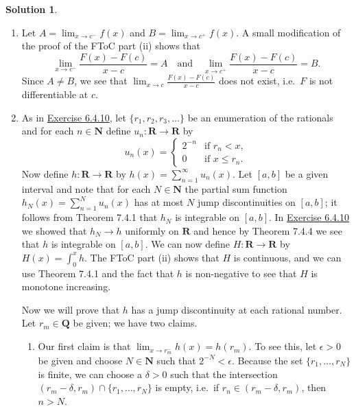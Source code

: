 \documentclass[12pt]{article}
\theoremstyle{definition}
\theoremstyle{exercise}
\theoremstyle{solution}
\newtheorem*{solution}{Solution}
\newcommand{\quand}{\quad \text{and} \quad}
\newcommand{\N}{\mathbf{N}}
\newcommand{\Q}{\mathbf{Q}}
\newcommand{\R}{\mathbf{R}}
\begin{document}
\begin{solution}
    \begin{enumerate}
        \item Let \( A = \lim_{x \to c^-} f(x) \) and \( B = \lim_{x \to c^+} f(x) \). A small modification of the proof of the FToC part (ii) shows that
        \[
            \lim_{x \to c^-} \frac{F(x) - F(c)}{x - c} = A \quand \lim_{x \to c^+} \frac{F(x) - F(c)}{x - c} = B.
        \]
        Since \( A \neq B \), we see that \( \lim_{x \to c} \tfrac{F(x) - F(c)}{x- c} \) does not exist, i.e.\ \( F \) is not differentiable at \( c \).

        \item As in \href{https://lew98.github.io/Mathematics/UA_Section_6_4_Exercises.pdf}{Exercise 6.4.10}, let \( \{ r_1, r_2, r_3, \ldots \} \) be an enumeration of the rationals and for each \( n \in \N \) define \( u_n : \R \to \R \) by
        \[
            u_n(x) = \begin{cases}
                2^{-n} & \text{if } r_n < x, \\
                0 & \text{if } x \leq r_n.
            \end{cases}
        \]
        Now define \( h : \R \to \R \) by \( h(x) = \sum_{n=1}^{\infty} u_n(x) \). Let \( [a, b] \) be a given interval and note that for each \( N \in \N \) the partial sum function \( h_N(x) = \sum_{n=1}^N u_n(x) \) has at most \( N \) jump discontinuities on \( [a, b] \); it follows from Theorem 7.4.1 that \( h_N \) is integrable on \( [a, b] \). In \href{https://lew98.github.io/Mathematics/UA_Section_6_4_Exercises.pdf}{Exercise 6.4.10} we showed that \( h_N \to h \) uniformly on \( \R \) and hence by Theorem 7.4.4 we see that \( h \) is integrable on \( [a, b] \). We can now define \( H : \R \to \R \) by \( H(x) = \int_0^x h \). The FToC part (ii) shows that \( H \) is continuous, and we can use Theorem 7.4.1 and the fact that \( h \) is non-negative to see that \( H \) is monotone increasing.

        Now we will prove that \( h \) has a jump discontinuity at each rational number. Let \( r_m \in \Q \) be given; we have two claims.
        \begin{enumerate}[label=(\roman*)]
            \item Our first claim is that \( \lim_{x \to r_m^-} h(x) = h(r_m) \). To see this, let \( \epsilon > 0 \) be given and choose \( N \in \N \) such that \( 2^{-N} < \epsilon \). Because the set \( \{ r_1, \ldots, r_N \} \) is finite, we can choose a \( \delta > 0 \) such that the intersection \( (r_m - \delta, r_m) \cap \{ r_1, \ldots, r_N \} \) is empty, i.e.\ if \( r_n \in (r_m - \delta, r_m) \), then \( n > N \).
            

\end{enumerate}
\end{enumerate}
\end{solution}
\end{document}
